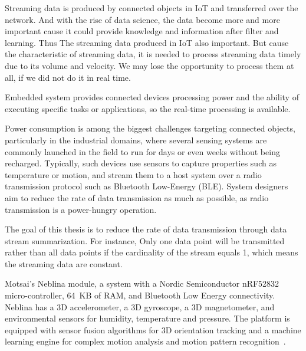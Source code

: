 

Streaming data is produced by connected objects in IoT and transferred over the
network.  And with the rise of data science, the data become more and more
important cause it could provide knowledge and information after filter and
learning. Thus The streaming data produced in IoT also important. But cause the
characteristic of streaming data, it is needed to process streaming data timely
due to its volume and velocity. We may lose the opportunity to process them at
all, if we did not do it in real time.

Embedded system provides connected devices processing power and the ability of
executing specific tasks or applications, so the real-time processing is
available. 

Power consumption is among the biggest challenges targeting connected  objects,
particularly in the industrial domains, where several sensing  systems are
commonly launched in the field to run for days or even  weeks without being
recharged. Typically, such devices use sensors to  capture properties such as
temperature or motion, and stream them to a  host system over a radio
transmission protocol such as Bluetooth  Low-Energy (BLE). System designers aim
to reduce the rate of data  transmission as much as possible, as radio
transmission is a  power-hungry operation.



The goal of this thesis is to reduce the rate of data transmission through data
stream summarization. For instance, Only one data point will be transmitted
rather than all data points if the cardinality of the stream equals 1, which
means the streaming data are constant.


Motsai's Neblina module, a system with a Nordic Semiconductor nRF52832
micro-controller, 64~KB of RAM,  and Bluetooth Low Energy connectivity. Neblina
has a 3D  accelerometer, a 3D gyroscope, a 3D magnetometer, and environmental
sensors for humidity, temperature and pressure. The platform is  equipped with
sensor fusion algorithms for 3D orientation tracking and  a machine learning
engine for complex motion analysis and motion  pattern
recognition~\cite{sarbishei2016accuracy}.




